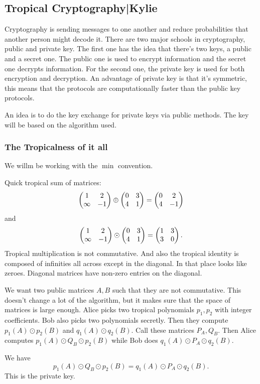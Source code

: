 \documentclass[12pt]{memoir}
\theoremstyle{definition}
\begin{document}
\subsection{Tropical Cryptography|Kylie}

Cryptography is sending messages to one another and reduce probabilities that another person might decode it. There are two major schools in cryptography, public and private key. The first one has the idea that there's two keys, a public and a secret one. The public one is used to encrypt information and the secret one decrypts information. For the second one, the private key is used for both encryption and decryption. An advantage of private key is that it's symmetric, this means that the protocols are computationally faster than the public key protocols.\par 
An idea is to do the key exchange for private keys via public methods. The key will be based on the algorithm used.

\subsubsection{The Tropicalness of it all}

We willm be working with the $\min$ convention. 

\begin{Ex}
    Quick tropical sum of matrices:
    $$\begin{pmatrix} 1 & 2 \\ \infty & -1 \end{pmatrix}\oplus\begin{pmatrix} 0 & 3 \\ 4 & 1 \end{pmatrix}=\begin{pmatrix} 0 & 2 \\ 4 & -1 \end{pmatrix}$$
    and
    $$\begin{pmatrix} 1 & 2 \\ \infty & -1 \end{pmatrix}\odot\begin{pmatrix} 0 & 3 \\ 4 & 1 \end{pmatrix}=\begin{pmatrix} 1 & 3 \\ 3 & 0 \end{pmatrix}.$$
    Tropical multiplication is not commutative. And also the tropical identity is composed of infinities all across except in the diagonal. In that place looks like zeroes. Diagonal matrices have non-zero entries on the diagonal.
\end{Ex}

We want two public matrices $A,B$ such that they are not commutative. This doesn't change a lot of the algorithm, but it makes sure that the space of matrices is large enough. Alice picks two tropical polynomials $p_1,p_2$ with integer coefficients. Bob also picks two polynomials secretly. Then they compute $p_1(A)\odot p_2(B)$ and $q_1(A)\odot q_2(B)$. Call these matrices $P_A,Q_B$. Then Alice computes $p_1(A)\odot Q_B\odot p_2(B)$ while Bob does $q_1(A)\odot P_A\odot q_2(B)$.

\begin{Lem}
We have 
$$p_1(A)\odot Q_B\odot p_2(B)=q_1(A)\odot P_A\odot q_2(B).$$
This is the private key.
\end{Lem}
\end{document}
